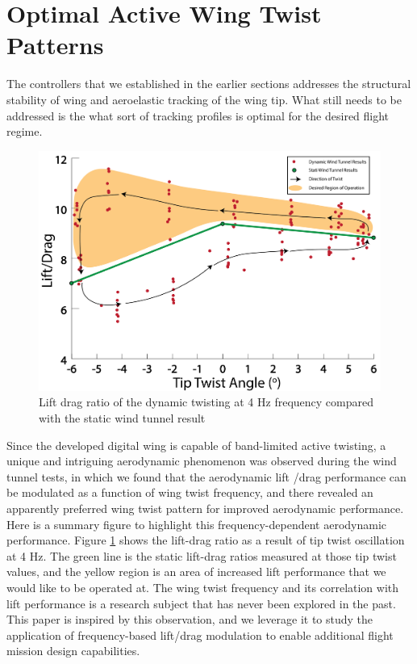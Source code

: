 \documentclass[11pt]{ucthesis}
\begin{document}

\section{Optimal Active Wing Twist Patterns}
The controllers that we established in the earlier sections addresses the structural stability of wing and aeroelastic tracking of the wing tip. What still needs to be addressed is the what sort of tracking profiles is optimal for the desired flight regime.

\begin{figure}[thpb]
\centering
\includegraphics[width=.75\linewidth]{./Figures/LD5454MotivationPlot.png}
\caption{Lift drag ratio of the dynamic twisting at 4 Hz frequency compared with the static wind tunnel result}
\label{fig:LDmot}
\end{figure}

Since the developed digital wing is capable of band-limited active twisting, a unique and intriguing aerodynamic phenomenon was observed during the wind tunnel tests, in which we found that the aerodynamic lift /drag performance can be modulated as a function of wing twist frequency, and there revealed an apparently preferred wing twist pattern for improved aerodynamic performance. Here is a summary figure to highlight this frequency-dependent aerodynamic performance. Figure \ref{fig:LDmot} shows the lift-drag ratio as a result of tip twist oscillation at 4 Hz. The green line is the static lift-drag ratios measured at those tip twist values, and the yellow region is an area of increased lift performance that we would like to be operated at. The wing twist frequency and its correlation with lift performance is a research subject that has never been explored in the past. This paper is inspired by this observation, and we leverage it to study the application of frequency-based lift/drag modulation to enable additional flight mission design capabilities. 
\end{document}
